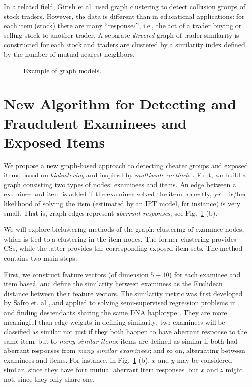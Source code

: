 \documentclass{article}
\begin{document}
In a related field, Girish et al. \cite{collusion_stock_graph_clustering} used graph clustering to detect collusion groups of stock traders. However, the data is different than in educational applications: for each item (stock) there are many ``responses'', i.e., the act of a trader buying or selling stock to another trader. A separate {\it directed} graph of trader similarity is constructed for each stock and traders are clustered by a similarity index defined by the number of mutual nearest neighbors.

\begin{figure}
    \centering
    \qquad
    \caption{Example of graph models.}
    \label{graph}
\end{figure}

\section{New Algorithm for Detecting  and Fraudulent Examinees and Exposed Items}
We propose a new graph-based approach to detecting cheater groups and exposed items based on {\it biclustering} and inspired by {\it multiscale methods} \cite{mg_guide}. First, we build a graph consisting two types of nodes: examinees and items. An edge between a examinee and item is added if the examinee solved the item correctly, yet his/her likelihood of solving the item (estimated by an IRT model, for instance) is very small. That is, graph edges represent {\it aberrant responses}; see Fig.~\ref{graph} (b).

We will explore biclustering methods of the graph: clustering of examinee nodes, which is tied to a clustering in the item nodes. The former clustering provides CSs, while the latter provides the corresponding exposed item sets. The method contains two main steps. 

First, we construct feature vectors (of dimension $5-10$) for each examinee and item based, and define the similarity between examinees as the Euclidean distance between their feature vectors. The similarity metric was first developed by Safro et. al \cite{safro}, and applied to solving semi-supervised regression problems in \cite{lamg} , and finding descendants sharing the same DNA haplotype \cite{primal}. They are more meaningful than edge weights in defining similarity: two examinees will be classified as similar not just if they both happen to have aberrant response to the same item, but to {\it many similar items}; items are defined as similar if both had aberrant responses from {\it many similar examinees}; and so on, alternating between examinees and items. For instance, in Fig.~\ref{graph} (b), $x$ and $y$ may be considered similar, since they have four mutual aberrant item responses, but $x$ and $z$ might not, since they only share one.
\end{document}
